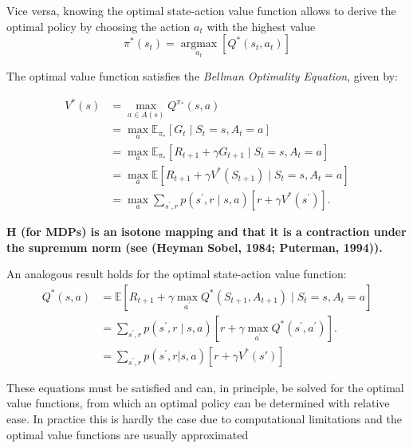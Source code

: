 \documentclass[a4paper,11pt]{report}
\theoremstyle{definition}
\theoremstyle{plain}
\theoremstyle{remark}  %
\begin{document}
Vice versa, knowing the optimal state-action value function allows to derive the optimal policy by 
choosing the action \(a_{t}\) with the highest value
\[
\pi^*\left(s_{t}\right) = \underset{a_{t}}{\operatorname{argmax}}\left[Q^{*}\left(s_{t}, a_{t}\right)\right]
\]

The optimal value function satisfies the \textit{Bellman Optimality Equation}, given by:

\begin{align}
    V^{\ast }(s)&=\max\limits_{a\in A(s)}Q^{\pi _{\ast }}(s,a) \nonumber \\ 
    & =\max\limits_{a}\mathbb{E}_{\pi _{\ast }}[G_{t}\mid S_{t}=s,A_{t}=a] \nonumber \\ 
    & =\max\limits_{a}\mathbb{E}_{\pi _{\ast }}[R_{t+1}+\gamma G_{t+1}\mid
    S_{t}=s,A_{t}=a] \nonumber \\ 
    & =\max\limits_{a}\mathbb{E}[R_{t+1}+\gamma V^{\ast }(S_{t+1})\mid
    S_{t}=s,A_{t}=a] \nonumber \\ 
    & =\max\limits_{a}\sum\limits_{s^{\prime },r}p(s^{\prime
    },r\mid s,a)\left[ r+\gamma V^{\ast }(s^{\prime })\right].%
    \label{Bellman-optimality-eq}
\end{align}

\textbf{
H (for MDPs) is an isotone mapping and that it is a contraction under the
supremum norm (see (Heyman Sobel, 1984; Puterman, 1994)).}


An analogous result holds for the optimal state-action value function:
\begin{align}
    Q^{\ast }(s,a)&=\mathbb{E}[R_{t+1}+\gamma\max\limits_{a^{\prime }}Q^{\ast
    }(S_{t+1},A_{t+1})\mid S_{t}=s,A_{t}=a] \nonumber \\ 
    & =\sum\limits_{s^{\prime },r}p(s^{\prime },r\mid s,a)\left[ r+\gamma\max\limits_{a^{\prime }}Q^{\ast }(s^{\prime },a^{\prime })\right]. \\
    & = \sum_{s^{\prime}, r} p(s^{\prime}, r | s, a) \left[ r + \gamma V^*(s') \right]
    \label{eq:bellman-state-action}
\end{align}


These equations must be satisfied and can, in principle, be solved for the optimal
value functions, from which an optimal policy can be determined with relative ease.
In practice this is hardly the case due to computational limitations and the optimal value functions 
are usually approximated
\end{document}
